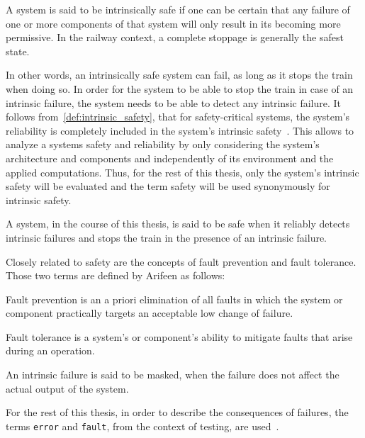 \begin{definition}
A system is said to be intrinsically safe if one can be certain that any failure of one or more components of that system will only result in its becoming more permissive.
In the railway context, a complete stoppage is generally the safest state.
\label{def:intrinsic_safety}
\end{definition}

In other words, an intrinsically safe system can fail, as long as it stops the train when doing so.
In order for the system to be able to stop the train in case of an intrinsic failure, the system needs to be able to detect any intrinsic failure.
It follows from~\autoref{def:intrinsic_safety}, that for safety-critical systems, the system's reliability is completely included in the system's intrinsic safety~\cite{BoulangerStandards}.
This allows to analyze a systems safety and reliability by only considering the system's architecture and components and independently of its environment and the applied computations.
Thus, for the rest of this thesis, only the system's intrinsic safety will be evaluated and the term safety will be used synonymously for intrinsic safety.
\begin{definition}
A system, in the course of this thesis, is said to be safe when it reliably detects intrinsic failures and stops the train in the presence of an intrinsic failure.
\label{def:safety}
\end{definition}

Closely related to safety are the concepts of fault prevention and fault tolerance.
Those two terms are defined by Arifeen \etal as follows:~\cite{ArifeenFaultTolerantTMR}

\begin{definition}
Fault prevention is an a priori elimination of all faults in which the system or component practically targets an acceptable low change of failure.
\end{definition}

\begin{definition}
Fault tolerance is a system's or component's ability to mitigate faults that arise during an operation.
\end{definition}

\begin{definition}
An intrinsic failure is said to be masked, when the failure does not affect the actual output of the system.
\end{definition}

For the rest of this thesis, in order to describe the consequences of failures, the terms \texttt{error} and \texttt{fault}, from the context of testing, are used~\cite{AmmannOffutt2016}.

